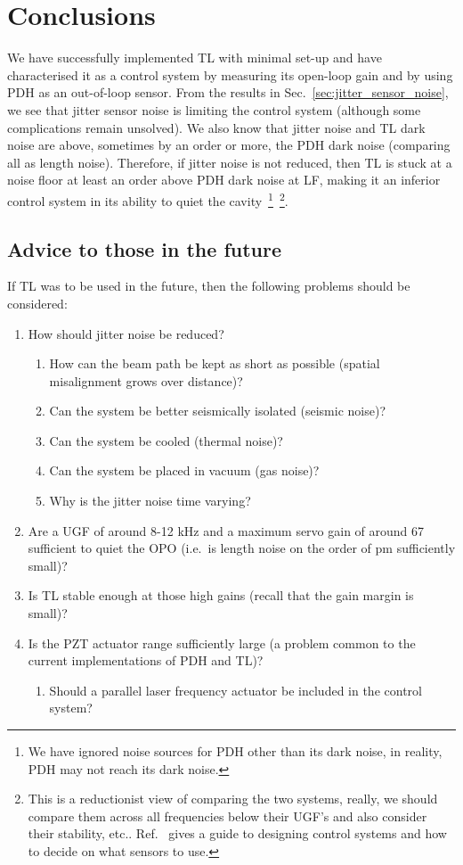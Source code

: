 \documentclass[aps,pra,superscriptaddress,reprint,nofootinbib]{revtex4-1}
\begin{document}
\section{Conclusions}
\label{sec:conclusions}

We have successfully implemented TL with minimal set-up and have characterised it as a control system by measuring its open-loop gain and by using PDH as an out-of-loop sensor. From the results in Sec.~\ref{sec:jitter_sensor_noise}, we see that jitter sensor noise is limiting the control system (although some complications remain unsolved). We also know that jitter noise and TL dark noise are above, sometimes by an order or more, the PDH dark noise (comparing all as length noise).
Therefore, if jitter noise is not reduced, then TL is stuck at a noise floor at least an order above PDH dark noise at LF, making it an inferior control system in its ability to quiet the cavity~\footnote{We have ignored noise sources for PDH other than its dark noise, in reality, PDH may not reach its dark noise.}~\footnote{This is a reductionist view of comparing the two systems, really, we should compare them across all frequencies below their UGF’s and also consider their stability, etc.. Ref.~\cite{FCS:2000} gives a guide to designing control systems and how to decide on what sensors to use.}.

\subsection{Advice to those in the future}

If TL was to be used in the future, then the following problems should be considered: 
\begin{enumerate}
\item How should jitter noise be reduced?
	\begin{enumerate}
	\item How can the beam path be kept as short as possible (spatial misalignment grows over distance)?
	\item Can the system be better seismically isolated (seismic noise)?
	\item Can the system be cooled (thermal noise)?
	\item Can the system be placed in vacuum (gas noise)?
	\item Why is the jitter noise time varying?
	\end{enumerate}
\item Are a UGF of around 8-12 kHz and a maximum servo gain of around 67 sufficient to quiet the OPO (i.e.\ is length noise on the order of pm sufficiently small)?
\item Is TL stable enough at those high gains (recall that the gain margin is small)?
\item Is the PZT actuator range sufficiently large (a problem common to the current implementations of PDH and TL)?
	\begin{enumerate}
	\item Should a parallel laser frequency actuator be included in the control system?
	\end{enumerate}
\end{enumerate}


\nocite{*}


\end{document}
